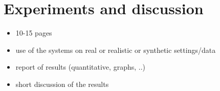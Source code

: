 \section{Experiments and discussion}
\label{sec:experiments}

\begin{itemize} 
    \item 10-15 pages
    \item use of the systems on real or realistic or synthetic settings/data
    \item report of results (quantitative, graphs, ..)
    \item short discussion of the results 
\end{itemize}